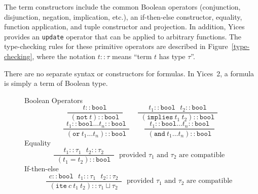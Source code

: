 \documentclass[11pt,twoside,fleqn,openright,titlepage]{cslreport}
\begin{document}
\medskip\noindent
The   term   constructors  include   the   common  Boolean   operators
(conjunction,   disjunction,    negation,   implication,   etc.),   an
if-then-else  constructor, equality,  function application,  and tuple
constructor   and   projection.  In   addition,   Yices  provides   an
\texttt{update}   operator   that   can   be  applied   to   arbitrary
functions. The  type-checking rules for these  primitive operators are
described in Figure~\ref{type-checking},  where the notation $t::\tau$
means ``term $t$ has type $\tau$''.

\medskip\noindent
There are no separate syntax or constructors for formulas. In Yices~2,
a formula is simply a term of Boolean type.

\begin{figure}
\begin{center}
Boolean Operators\\[1ex]
\begin{displaymath}
\hspace{3em}
\frac{~~t::\mathtt{bool}~~}{~~(\mathtt{not}\ t)::\mathtt{bool}~~}
\hspace{2em}
\frac{~~t_1::\mathtt{bool}~~~t_2::\mathtt{bool}~~}{~~(\mathtt{implies}\ t_1\ t_2)::\mathtt{bool}~~}
\end{displaymath}
\begin{displaymath}
\hspace{2em}
\frac{~~t_1::\mathtt{bool}\ldots t_n::\mathtt{bool}~~}{~~(\mathtt{or}\ t_1\ldots t_n)::\mathtt{bool}~~}
\hspace{2em}
\frac{~~t_1::\mathtt{bool}\ldots t_n::\mathtt{bool}~~}{~~(\mathtt{and}\ t_1\ldots t_n)::\mathtt{bool}~~}
\end{displaymath}
\vspace*{2ex}
Equality\\[1ex]
\begin{displaymath}
\hspace{2em}
\frac{~~t_1::\tau_1~~~t_2::\tau_2~~}{~~(t_1 = t_2)::\mathtt{bool}~~}\mbox{~~provided $\tau_1$ and $\tau_2$ are compatible}
\end{displaymath}
\vspace*{2ex}
If-then-else\\[1ex]
\begin{displaymath}
\hspace{2em}
\frac{~~c::\mathtt{bool}~~~t_1::\tau_1~~~t_2::\tau_2~~}{~~(\mathtt{ite}\ c\ t_1\ t_2)::\tau_1\sqcup\tau_2~~}
\mbox{~~provided $\tau_1$ and $\tau_2$ are compatible}
\end{displaymath}

\end{center}
\end{figure}
\end{document}
